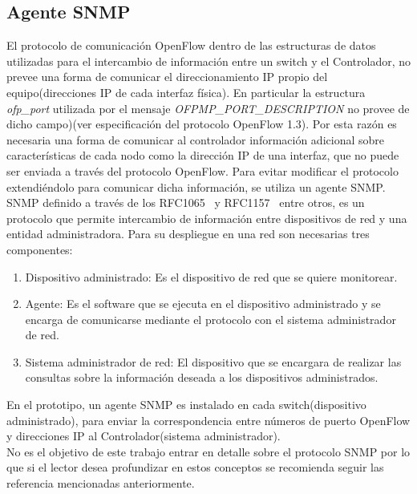 \subsection{Agente SNMP}
El protocolo de comunicación OpenFlow dentro de las estructuras de datos utilizadas para el intercambio de información entre un switch y el Controlador, no prevee una forma de comunicar el direccionamiento IP propio del equipo(direcciones IP de cada interfaz física). En particular la estructura \textit{ofp\_port} utilizada por el mensaje \textit{OFPMP\_PORT\_DESCRIPTION} no provee de dicho campo)(ver especificación del protocolo OpenFlow 1.3\citep{ofv133spec}). Por esta razón es necesaria una forma de comunicar al controlador información adicional sobre características de cada nodo como la dirección IP de una interfaz, que no puede ser enviada a través del protocolo OpenFlow. Para evitar modificar el protocolo extendiéndolo para comunicar dicha informaci\'on, se utiliza un agente SNMP.\\

SNMP definido a través de los RFC1065~\citep{rose1990structure} y RFC1157~\citep{case1989simple} entre otros, es un protocolo que permite intercambio de información entre dispositivos de red y una entidad administradora. Para su despliegue en una red son necesarias tres componentes: 

\begin{enumerate}

\item Dispositivo administrado: Es el dispositivo de red que se quiere monitorear.

\item Agente: Es el software que se ejecuta en el dispositivo administrado y se encarga de comunicarse mediante el protocolo con el sistema administrador de red.

\item Sistema administrador de red: El dispositivo que se encargara de realizar las consultas sobre la información deseada a los dispositivos administrados.

\end{enumerate}	

En el prototipo, un agente SNMP es instalado en cada switch(dispositivo administrado), para enviar la correspondencia entre números de puerto OpenFlow y direcciones IP al Controlador(sistema administrador).\\

No es el objetivo de este trabajo entrar en detalle sobre el protocolo SNMP por lo que si el lector desea profundizar en estos conceptos se recomienda seguir las referencia mencionadas anteriormente.

